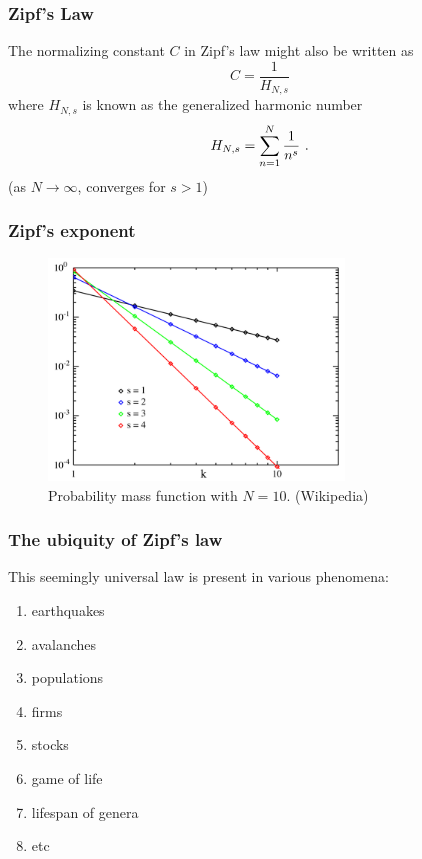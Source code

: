 \documentclass{beamer}
\begin{document}
\frame
{
  \frametitle{Zipf's Law}
  The normalizing constant $C$ in Zipf's law might also be written as
  \begin{equation}
  C = \frac{1}{H_{N,s}} 
  \end{equation}
  where $H_{N,s}$ is known as the generalized harmonic number
  \begin{equation}
  H_{N,s} = \sum_{n=1}^{N} \frac{1}{n^s} \textmd{ .}
  \end{equation}
  (as $N \rightarrow \infty$, converges for $s>1$)
}



\frame
{
  \frametitle{Zipf's exponent}

  \begin{figure}[h!]
  \centering
  \includegraphics[width=0.7\textwidth]{images/zipfdistribution.png}
  \caption{Probability mass function with $N=10$. (Wikipedia)}
  \end{figure}
}


\frame
{
  \frametitle{The ubiquity of Zipf's law}
  
  This seemingly universal law is present in various phenomena:
  \begin{enumerate}
  \item earthquakes 
  \item avalanches
  \item populations
  \item firms
  \item stocks
  \item game of life
  \item lifespan of genera
  \item etc 
  \end{enumerate}
}
\end{document}
